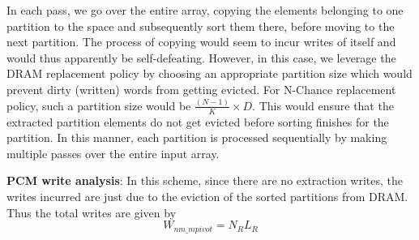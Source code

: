 In each pass, we go over the entire array, copying the elements belonging to one partition to the space and subsequently sort them there, before moving to the next partition. The process of copying would seem to incur writes of itself and would thus apparently be self-defeating. However, in this case, we leverage the DRAM replacement policy by choosing an appropriate partition size which would prevent dirty (written) words from getting evicted. For N-Chance replacement policy, such a partition size would be $\frac{(N-1)}{K}\times D$. This would ensure that the extracted partition elements do not get evicted before sorting finishes for the partition. In this manner, each partition is processed sequentially by making multiple passes over the entire input array.

\textbf{PCM write analysis}: In this scheme, since there are no extraction writes, the writes incurred are just due to the eviction of the sorted partitions from DRAM. Thus the total writes are given by 
\begin{equation}\label{eq:nm_mpivot}
  W_{nm\_mpivot} = N_RL_R
\end{equation}